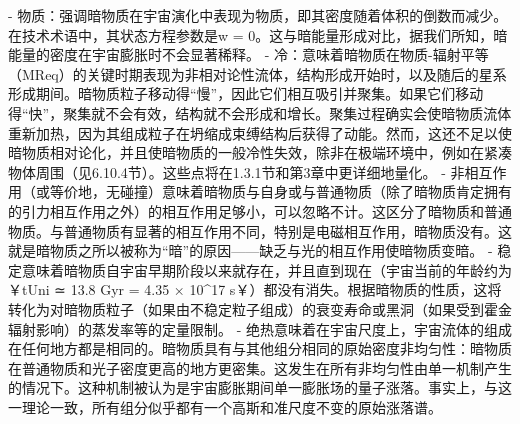 - 物质：强调暗物质在宇宙演化中表现为物质，即其密度随着体积的倒数而减少。在技术术语中，其状态方程参数是w = 0。这与暗能量形成对比，据我们所知，暗能量的密度在宇宙膨胀时不会显著稀释。
- 冷：意味着暗物质在物质-辐射平等（MReq）的关键时期表现为非相对论性流体，结构形成开始时，以及随后的星系形成期间。暗物质粒子移动得“慢”，因此它们相互吸引并聚集。如果它们移动得“快”，聚集就不会有效，结构就不会形成和增长。聚集过程确实会使暗物质流体重新加热，因为其组成粒子在坍缩成束缚结构后获得了动能。然而，这还不足以使暗物质相对论化，并且使暗物质的一般冷性失效，除非在极端环境中，例如在紧凑物体周围（见6.10.4节）。这些点将在1.3.1节和第3章中更详细地量化。
- 非相互作用（或等价地，无碰撞）意味着暗物质与自身或与普通物质（除了暗物质肯定拥有的引力相互作用之外）的相互作用足够小，可以忽略不计。这区分了暗物质和普通物质。与普通物质有显著的相互作用不同，特别是电磁相互作用，暗物质没有。这就是暗物质之所以被称为“暗”的原因——缺乏与光的相互作用使暗物质变暗。
- 稳定意味着暗物质自宇宙早期阶段以来就存在，并且直到现在（宇宙当前的年龄约为￥tUni ≃ 13.8 Gyr = 4.35 × 10^17 s￥）都没有消失。根据暗物质的性质，这将转化为对暗物质粒子（如果由不稳定粒子组成）的衰变寿命或黑洞（如果受到霍金辐射影响）的蒸发率等的定量限制。
- 绝热意味着在宇宙尺度上，宇宙流体的组成在任何地方都是相同的。暗物质具有与其他组分相同的原始密度非均匀性：暗物质在普通物质和光子密度更高的地方更密集。这发生在所有非均匀性由单一机制产生的情况下。这种机制被认为是宇宙膨胀期间单一膨胀场的量子涨落。事实上，与这一理论一致，所有组分似乎都有一个高斯和准尺度不变的原始涨落谱。